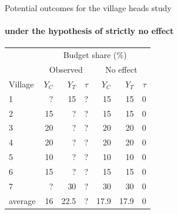 \begin{frame}{Potential outcomes for the village heads study}
\framesubtitle{under     the hypothesis of     strictly no effect}

\begin{tabular}{l|rrr|rrr} \hline
& \multicolumn{6}{c}{Budget share (\%)} \\
& \multicolumn{3}{c}{Observed} & \multicolumn{3}{c}{No effect} \\
Village &$Y_{C}$& $Y_{T}$& $\tau$  &$Y_{C}$& $Y_{T}$& $\tau$ \\ \hline
1&  ? & 15 & ? & 15 & 15 & 0 \\
2& 15 & ? &   ?  & 15 & 15 & 0 \\ 
3& 20 & ? &   ?  & 20 & 20 & 0 \\
4& 20 & ? &   ?  & 20 & 20 & 0 \\
5& 10 & ? &   ?  & 10 & 10 & 0 \\
6& 15 & ? &   ?  & 15 & 15 & 0 \\
7& ?   & 30&? & 30 &30 & 0 \\ \hline
average & 16 & 22.5 & ? & 17.9 & 17.9 & 0 \\ \hline
\end{tabular}
\end{frame}


